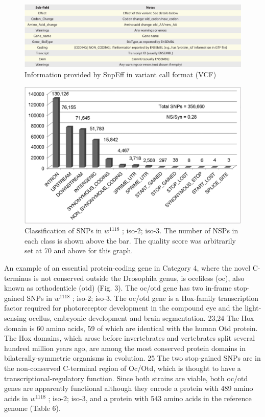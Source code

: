 \begin{figure}
    \centering
    \includegraphics[width=14cm]{snpeff_table4.png}
    \caption{Information provided by SnpEff in variant call format (VCF)}
    \label{fig:snpeffTab3}
\end{figure}

\begin{figure}
    \centering
    \includegraphics[width=14cm]{snpeff_fig1.png}
    \caption{Classification of SNPs in $w^{1118}$ ; iso-2; iso-3. The number of NSPs in each class is shown above the bar. The quality score was arbitrarily set at 70 and above for this graph.}
    \label{fig:snpeffTab3}
\end{figure}

An example of an essential protein-coding gene in Category 4, where the novel C-terminus is not conserved outside the Drosophila genus, is oceliless (oc), also known as orthodenticle (otd) (Fig. 3). The oc/otd gene has two in-frame stop-gained SNPs in $w^{1118}$ ; iso-2; iso-3. The oc/otd gene is a Hox-family transcription factor required for photoreceptor development in the compound eye and the light-sensing ocellus, embryonic development and brain segmentation. 23,24 The Hox domain is 60 amino acids, 59 of which are identical with the human Otd protein. The Hox domains, which arose before invertebrates and vertebrates split several hundred million years ago, are among the most conserved protein domains in bilaterally-symmetric organisms in evolution. 25 The two stop-gained SNPs are in the non-conserved C-terminal region of Oc/Otd, which is thought to have a transcriptional-regulatory function. Since both strains are viable, both oc/otd genes are apparently functional although they encode a protein with 489 amino acids in $w^{1118}$ ; iso-2; iso-3, and a protein with 543 amino acids in the reference genome (Table 6).

